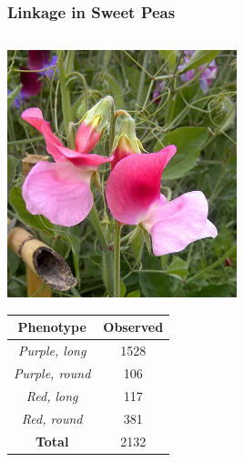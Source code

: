 \documentclass{beamer}
\begin{document}
\begin{frame}
	\frametitle{Linkage in Sweet Peas}		
	
	
	\begin{center}
		\begin{columns}
			
			\begin{column}{0.5\textwidth}
				\centering						\includegraphics[keepaspectratio, width  =0.5\textwidth]{img/sweetPea} \\
				
				\vspace{20pt}
				\begin{tabular}{c|c}
					\textbf{Phenotype} & \textbf{Observed } \\
					\hline
					\textit{Purple, long}& 1528\\
					
					\textit{Purple, round}&106\\
					
					\textit{Red, long}&117\\
					
					\textit{Red, round}&381\\
					\hline
					\textbf{Total} & 2132\\
				\end{tabular}	
				

\end{column}
\end{columns}
\end{center}
\end{frame}
\end{document}
